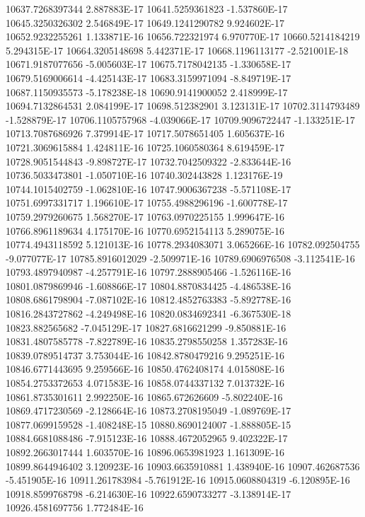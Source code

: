 10637.7268397344  2.887883E-17
10641.5259361823  -1.537860E-17
10645.3250326302  2.546849E-17
10649.1241290782  9.924602E-17
10652.9232255261  1.133871E-16
10656.722321974  6.970770E-17
10660.5214184219  5.294315E-17
10664.3205148698  5.442371E-17
10668.1196113177  -2.521001E-18
10671.9187077656  -5.005603E-17
10675.7178042135  -1.330658E-17
10679.5169006614  -4.425143E-17
10683.3159971094  -8.849719E-17
10687.1150935573  -5.178238E-18
10690.9141900052  2.418999E-17
10694.7132864531  2.084199E-17
10698.512382901  3.123131E-17
10702.3114793489  -1.528879E-17
10706.1105757968  -4.039066E-17
10709.9096722447  -1.133251E-17
10713.7087686926  7.379914E-17
10717.5078651405  1.605637E-16
10721.3069615884  1.424811E-16
10725.1060580364  8.619459E-17
10728.9051544843  -9.898727E-17
10732.7042509322  -2.833644E-16
10736.5033473801  -1.050710E-16
10740.302443828  1.123176E-19
10744.1015402759  -1.062810E-16
10747.9006367238  -5.571108E-17
10751.6997331717  1.196610E-17
10755.4988296196  -1.600778E-17
10759.2979260675  1.568270E-17
10763.0970225155  1.999647E-16
10766.8961189634  4.175170E-16
10770.6952154113  5.289075E-16
10774.4943118592  5.121013E-16
10778.2934083071  3.065266E-16
10782.092504755  -9.077077E-17
10785.8916012029  -2.509971E-16
10789.6906976508  -3.112541E-16
10793.4897940987  -4.257791E-16
10797.2888905466  -1.526116E-16
10801.0879869946  -1.608866E-17
10804.8870834425  -4.486538E-16
10808.6861798904  -7.087102E-16
10812.4852763383  -5.892778E-16
10816.2843727862  -4.249498E-16
10820.0834692341  -6.367530E-18
10823.882565682  -7.045129E-17
10827.6816621299  -9.850881E-16
10831.4807585778  -7.822789E-16
10835.2798550258  1.357283E-16
10839.0789514737  3.753044E-16
10842.8780479216  9.295251E-16
10846.6771443695  9.259566E-16
10850.4762408174  4.015808E-16
10854.2753372653  4.071583E-16
10858.0744337132  7.013732E-16
10861.8735301611  2.992250E-16
10865.672626609  -5.802240E-16
10869.4717230569  -2.128664E-16
10873.2708195049  -1.089769E-17
10877.0699159528  -1.408248E-15
10880.8690124007  -1.888805E-15
10884.6681088486  -7.915123E-16
10888.4672052965  9.402322E-17
10892.2663017444  1.603570E-16
10896.0653981923  1.161309E-16
10899.8644946402  3.120923E-16
10903.6635910881  1.438940E-16
10907.462687536  -5.451905E-16
10911.261783984  -5.761912E-16
10915.0608804319  -6.120895E-16
10918.8599768798  -6.214630E-16
10922.6590733277  -3.138914E-17
10926.4581697756  1.772484E-16
